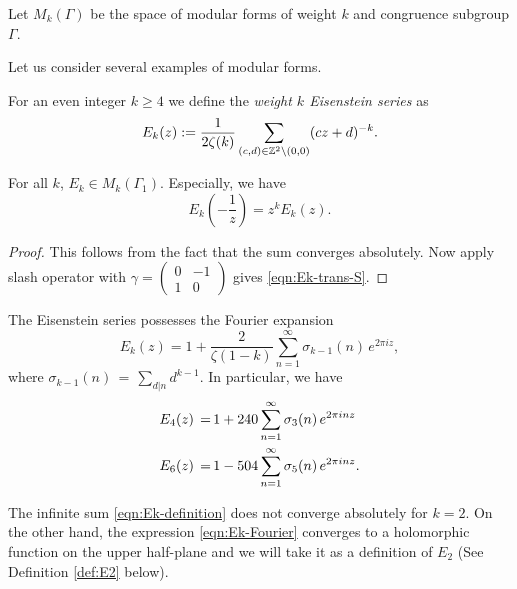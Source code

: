 \begin{definition}\label{def:Mk}\leanok
    Let $M_k(\Gamma)$ be the space of modular forms of weight $k$ and congruence subgroup $\Gamma$.
\end{definition}


Let us consider several examples of modular forms.
\begin{definition}\label{def:Ek}%
For an even integer $k\geq 4$ we define the \emph{weight $k$ Eisenstein series} as
\begin{equation}\label{eqn:Ek-definition}
E_k(z):=\frac{1}{2\zeta(k)}\sum_{(c,d)\in\mathbb{Z}^2\backslash(0,0)}(cz+d)^{-k}.\end{equation}
\end{definition}
\begin{lemma}\label{lemma:Ek-is-modular-form}
For all $k$, $E_k\in M_k(\Gamma_1)$.
Especially, we have
\begin{equation}\label{eqn:Ek-trans-S}
    E_k \left(-\frac{1}{z}\right) = z^k E_k(z).
\end{equation}
\end{lemma}
\begin{proof}
This follows from the fact that the sum converges absolutely.
Now apply slash operator with $\gamma = \left(\begin{smallmatrix} 0 & -1 \\ 1 & 0 \end{smallmatrix}\right)$ gives \eqref{eqn:Ek-trans-S}.
\end{proof}

\begin{lemma}\label{lemma:Ek-Fourier}\leanok
The Eisenstein series possesses the Fourier expansion
\begin{equation}\label{eqn:Ek-Fourier}E_k(z)=1+\frac{2}{\zeta(1-k)}\sum_{n=1}^\infty \sigma_{k-1}(n)\,e^{2\pi i z}, \end{equation}
where $\sigma_{k-1}(n)\,=\,\sum_{d|n} d^{k-1}$. In particular, we have
\begin{align}
  E_4(z)\,=\,& 1+240\sum_{n=1}^\infty \sigma_3(n)\,e^{2\pi i n z} \notag \\
  E_6(z)\,=\,& 1-504\sum_{n=1}^\infty \sigma_5(n)\,e^{2\pi i n z}. \notag
\end{align}
\end{lemma}
The infinite sum \eqref{eqn:Ek-definition} does not converge absolutely for $k=2$.
On the other hand, the expression \eqref{eqn:Ek-Fourier} converges to a holomorphic function on the upper half-plane and we will take it as a definition of $E_2$ (See Definition \ref{def:E2} below).


